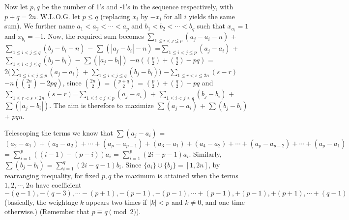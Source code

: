 \documentclass[11pt,a4paper]{article}
\begin{document}
\begin{enumerate}
Now let $p,q$ be the number of 1's and -1's in the sequence respectively, with $p+q=2n$. W.L.O.G. let $p\le q$ (replacing $x_i$ by $-x_i$ for all $i$ yields the same sum). We further name $a_1< a_2<\cdots <a_p$ and $b_1< b_2<\cdots <b_q$ such that $x_{a_i}=1$ and $x_{b_i}=-1$. Now, the required sum becomes $\displaystyle\sum_{1\le i<j\le p} (a_j-a_i-n)$ + $\displaystyle\sum_{1\le i<j\le q} (b_j-b_i-n)$ $-$ $\displaystyle\sum (|a_j-b_i|-n)$ =$\displaystyle\sum_{1\le i<j\le p} (a_j-a_i)$ + $\displaystyle\sum_{1\le i<j\le q} (b_j-b_i)$ $-$ $\displaystyle\sum (|a_j-b_i|)$ $-n(\binom{p}{2}+\binom{q}{2}-pq)$ = $2(\displaystyle\sum_{1\le i<j\le p} (a_j-a_i)$ + $\displaystyle\sum_{1\le i<j\le q} (b_j-b_i))$ $-\displaystyle\sum_{1\le r< s\le 2n} (s-r)$ $-n(\binom{2n}{2}-2pq)$, since $\binom{2n}{2}$ = $\binom{p+q}{2}$ = $\binom{p}{2}+\binom{q}{2}+pq$ and $\displaystyle\sum_{1\le r< s\le 2n} (s-r)$=$\displaystyle\sum_{1\le i<j\le p} (a_j-a_i)$ + $\displaystyle\sum_{1\le i<j\le q} (b_j-b_i)$ $+$ $\displaystyle\sum (|a_j-b_i|)$. The aim is therefore to maximize $\displaystyle\sum (a_j-a_i)$ + $\displaystyle\sum (b_j-b_i)$ + $pqn$.

Telescoping the terms we know that $\displaystyle\sum (a_j-a_i)$ = $(a_2-a_1)+(a_3-a_2)+\cdots +(a_p-a_{p-1})+(a_3-a_1)+(a_4-a_2)+\cdots +(a_p-a_{p-2})+\cdots + (a_p-a_1)$ = $\sum_{i=1}^{p}((i-1)-(p-i))a_i$ = $\displaystyle\sum_{i=1}^{p} (2i-p-1)a_i$. Similarly, $\displaystyle\sum (b_j-b_i)$ = $\displaystyle\sum_{i=1}^{q} (2i-q-1)b_i$. Since $\{a_i\}\cup\{b_j\}=[1,2n]$, by rearranging inequality, for fixed $p, q$ the maximum is attained when the terms $1,2,\cdots , 2n$ have coefficient $-(q-1),-(q-3),\cdots -(p+1), -(p-1),-(p-1),\cdots +(p-1),+(p-1), +(p+1),\cdots +(q-1)$ (basically, the weightage $k$ appears two times if $|k|<p$ and $k\ne 0$, and one time otherwise.) (Remember that $p\equiv q\pmod {2}$).


\end{enumerate}
\end{document}
